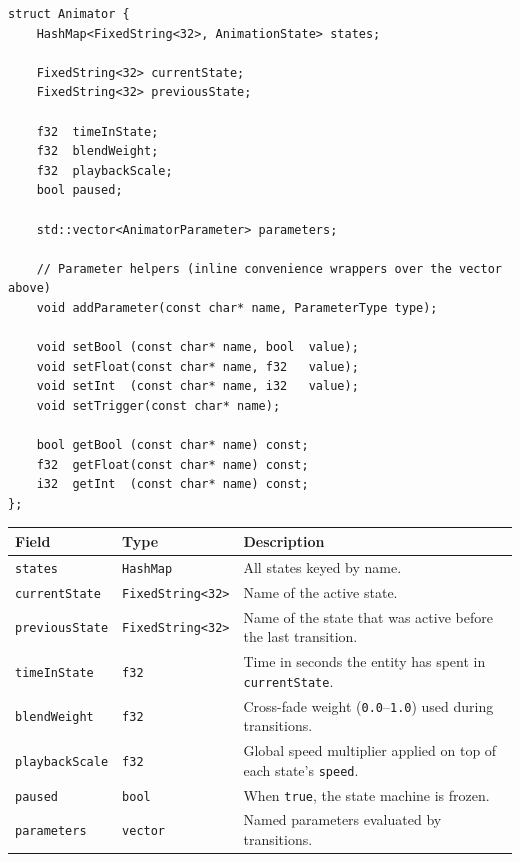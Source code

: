 \begin{lstlisting}
struct Animator {
    HashMap<FixedString<32>, AnimationState> states;

    FixedString<32> currentState;
    FixedString<32> previousState;

    f32  timeInState;
    f32  blendWeight;
    f32  playbackScale;
    bool paused;

    std::vector<AnimatorParameter> parameters;

    // Parameter helpers (inline convenience wrappers over the vector above)
    void addParameter(const char* name, ParameterType type);

    void setBool (const char* name, bool  value);
    void setFloat(const char* name, f32   value);
    void setInt  (const char* name, i32   value);
    void setTrigger(const char* name);

    bool getBool (const char* name) const;
    f32  getFloat(const char* name) const;
    i32  getInt  (const char* name) const;
};
\end{lstlisting}

\begin{longtable}{llp{7.5cm}}
\toprule
\textbf{Field}         & \textbf{Type}   & \textbf{Description} \\
\midrule
\texttt{states}        & \texttt{HashMap} & All states keyed by name. \\
\texttt{currentState}  & \texttt{FixedString<32>} & Name of the active state. \\
\texttt{previousState} & \texttt{FixedString<32>} & Name of the state that was active before the last transition. \\
\texttt{timeInState}   & \texttt{f32}    & Time in seconds the entity has spent in \texttt{currentState}. \\
\texttt{blendWeight}   & \texttt{f32}    & Cross-fade weight (\texttt{0.0}–\texttt{1.0}) used during transitions. \\
\texttt{playbackScale} & \texttt{f32}    & Global speed multiplier applied on top of each state's \texttt{speed}. \\
\texttt{paused}        & \texttt{bool}   & When \texttt{true}, the state machine is frozen. \\
\texttt{parameters}    & \texttt{vector} & Named parameters evaluated by transitions. \\
\bottomrule
\end{longtable}

